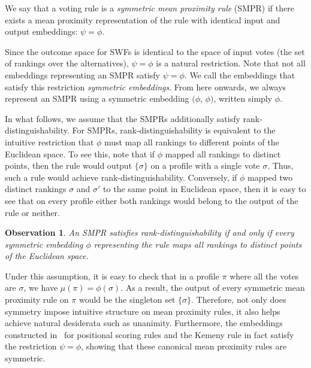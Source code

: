 \documentclass[prodmode]{acmsmall-ec14}
\newtheorem{observation}[theorem]{Observation}
\begin{document}
\begin{definition}
We say that a voting rule is a \emph{symmetric mean proximity rule} (SMPR) if there exists a mean proximity representation of the rule with identical input and output embeddings: $\psi = \phi$. 
\end{definition} 
%
Since the outcome space for SWFs is identical to the space of input votes (the set of rankings over the alternatives), $\psi = \phi$ is a natural restriction. Note that not all embeddings representing an SMPR satisfy $\psi = \phi$. We call the embeddings that satisfy this restriction \emph{symmetric embeddings}. From here onwards, we always represent an SMPR using a symmetric embedding $(\phi$, $\phi)$, written simply $\phi$.

In what follows, we assume that the SMPRs additionally satisfy rank-distinguishability. For SMPRs, rank-distinguishability is equivalent to the intuitive restriction that $\phi$ must map all rankings to different points of the Euclidean space. To see this, note that if $\phi$ mapped all rankings to distinct points, then the rule would output $\{\sigma\}$ on a profile with a single vote $\sigma$. Thus, such a rule would achieve rank-distinguishability. Conversely, if $\phi$ mapped two distinct rankings $\sigma$ and $\sigma'$ to the same point in Euclidean space, then it is easy to see that on every profile either both rankings would belong to the output of the rule or neither. 


\begin{observation}
An SMPR satisfies rank-distinguishability if and only if every symmetric embedding $\phi$ representing the rule maps all rankings to distinct points of the Euclidean space.
\end{observation}
%
Under this assumption, it is easy to check that in a profile $\pi$ where all the votes are $\sigma$, we have $\mu(\pi) = \phi(\sigma)$. As a result, the output of every symmetric mean proximity rule on $\pi$ would be the singleton set $\{\sigma\}$. Therefore, not only does symmetry impose intuitive structure on mean proximity rules, it also helps achieve natural desiderata such as unanimity. Furthermore, the embeddings constructed in~\cite{Zwicker08a} for positional scoring rules and the Kemeny rule in fact satisfy the restriction $\psi = \phi$, showing that these canonical mean proximity rules are symmetric. 
\end{document}
